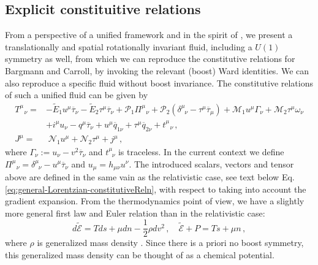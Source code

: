 \documentclass[superscriptaddress,prd,nofootinbib,preprintnumbers,longbibliography,11pt,eqsecnum]{revtex4-1}
\begin{document}
\subsection{Explicit constituitive relations}
From a perspective of a unified framework and in the spirit of \cite{deBoer:2017abi}, we present a translationally and spatial rotationally invariant fluid, including a $U(1)$ symmetry as well, from which we can reproduce the constitutive relations for Bargmann and Carroll, by invoking the relevant (boost) Ward identities. We can also reproduce a specific fluid without boost invariance.
The constitutive relations of such a unified fluid can be given by
\begin{equation}\begin{aligned}\label{eq:aristotle_const}
	T^{\mu}_{\;\;\,\nu}
	=&
	-
	\tilde{E}_{1} u^{\mu}\overline{\tau}_{\nu}
	-
	\tilde{E}_{2} \tau^{\mu}\overline{\tau}_{\nu}
	+
	\mathcal{P}_{1}\Pi^{\mu}_{\;\;\,\nu}
	+
	\mathcal{P}_{2}
	\left(
		\delta^{\mu}_{\;\;\nu}
		-
		\tau^{\mu}\overline{\tau}_{\mu}
	\right)
	+
	\mathcal{M}_{1} u^{\mu}
	\Gamma_{\nu}
	+
	\mathcal{M}_{2} \tau^{\mu}
	\omega_{\nu}
	\\&
	+
	i^{\mu}u_{\nu}
	-
	q^{\mu}\overline{\tau}_{\nu}
	+
	u^{\mu}\overline{q}_{1\nu}
	+
	\tau^{\mu}\overline{q}_{2\nu}
	+
	t^{\mu}_{\;\;\,\nu}
	\,,
	\\
	J^{\mu}
	=&\;
	\mathcal{N}_{1} u^{\mu}
	+
	\mathcal{N}_{2} \tau^{\mu}
	+
	j^{\mu}
	\,,
\end{aligned}\end{equation}
where $\Gamma_{\nu}:=u_{\nu}-v^{2}\overline{\tau}_{\nu}$ and $t^{\mu}_{\;\;\nu}$ is traceless. In the current context we define $\Pi^{\mu}_{\;\;\,\nu}=\delta^{\mu}_{\;\;\nu}-u^{\mu}\overline{\tau}_{\nu}$ and $u_{\mu}=h_{\mu\nu}u^{\nu}$. The introduced scalars, vectors and tensor above are defined in the same vain as the relativistic case, see text below Eq. \eqref{eq:general-Lorentzian-constitutiveReln}, with respect to taking into account the gradient expansion.
From the thermodynamics point of view, we have a slightly more general first law and Euler relation than in the relativistic case:
\begin{equation}\label{eq:aristotle_thermo}
	d\tilde{\mathcal{E}}
	=
	Tds
	+
	\mu dn
	-
	\frac{1}{2}\rho dv^{2}
	\,,
	\quad
	\tilde{\mathcal{E}}
	+
	P
	=
	T
	s
	+
	\mu
	n
	\,,
\end{equation}
where $\rho$ is generalized mass density \cite{deBoer:2017ing}. Since there is a priori no boost symmetry, this generalized mass density can be thought of as a chemical potential.
\end{document}
